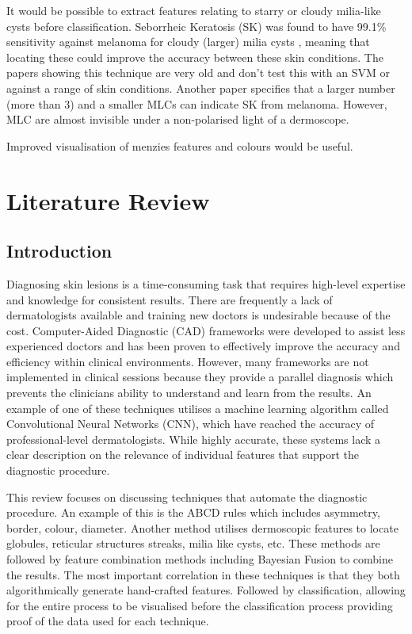 \documentclass[12pt]{report}
\begin{document}
It would be possible to extract features relating to starry or cloudy milia-like cysts before classification. Seborrheic Keratosis (SK) was found to have 99.1\% sensitivity against melanoma for cloudy (larger) milia cysts \cite{Stricklin2011}, meaning that locating these could improve the accuracy between these skin conditions. The papers showing this technique are very old and don't test this with an SVM or against a range of skin conditions. Another paper \cite{Minagawa2017} specifies that a larger number (more than 3) and a smaller MLCs can indicate SK from melanoma. However, MLC are almost invisible under a non-polarised light of a dermoscope.

Improved visualisation of menzies features and colours would be useful.

\chapter{Literature Review}

\section{Introduction}
Diagnosing skin lesions is a time-consuming task that requires high-level expertise and knowledge for consistent results. There are frequently a lack of dermatologists available and training new doctors is undesirable because of the cost. Computer-Aided Diagnostic (CAD) frameworks were developed to assist less experienced doctors and has been proven to effectively improve the accuracy and efficiency within clinical environments\cite{FerrantediRuffano2018}. However, many frameworks are not implemented in clinical sessions because they provide a parallel diagnosis which prevents the clinicians ability to understand and learn from the results. An example of one of these techniques utilises a machine learning algorithm called Convolutional Neural Networks (CNN), which have reached the accuracy of professional-level dermatologists\cite{Andre2017}. While highly accurate, these systems lack a clear description on the relevance of individual features that support the diagnostic procedure.

This review focuses on discussing techniques that automate the diagnostic procedure. An example of this is the ABCD rules\cite{Ali2020} which includes asymmetry, border, colour, diameter. Another method utilises dermoscopic features to locate globules, reticular structures streaks, milia like cysts, etc. These methods are followed by feature combination methods including Bayesian Fusion to combine the results\cite{Lopez-Labraca2018}. The most important correlation in these techniques is that they both algorithmically generate hand-crafted features. Followed by classification, allowing for the entire process to be visualised before the classification process providing proof of the data used for each technique.
\end{document}
